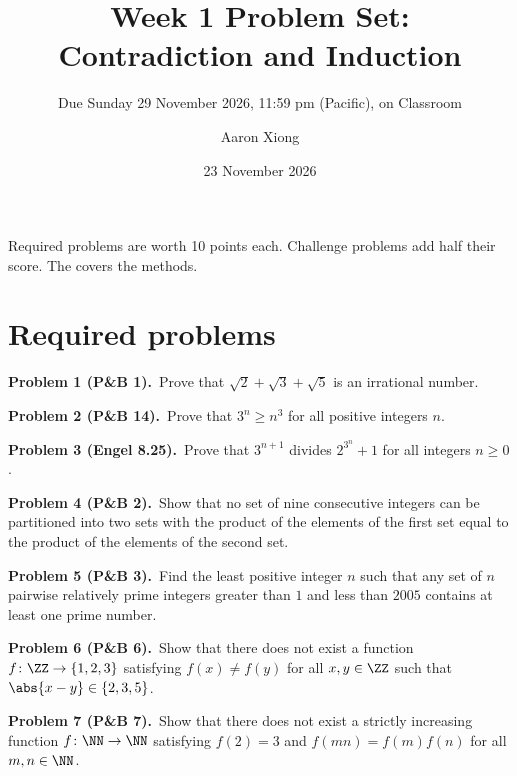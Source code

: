 \documentclass[10pt]{scrartcl}
\title{Week 1 Problem Set: Contradiction and Induction}
\subtitle{Due Sunday 29 November 2026, 11:59 pm (Pacific), on Classroom}
\author{Aaron Xiong}
\date{23 November 2026}
\begin{document}
\maketitle

Required problems are worth 10 points each. Challenge problems add half their score. The  covers the methods.

\section*{Required problems}

\begin{prob}\textbf{Problem 1 (P\&B 1).}\ Prove that $\sqrt2 + \sqrt3 + \sqrt5$ is an irrational number.\end{prob}

\begin{prob}\textbf{Problem 2 (P\&B 14).}\ Prove that $3^n \geq n^3$ for all positive integers $n$.\end{prob}

\begin{prob}\textbf{Problem 3 (Engel 8.25).}\ Prove that $3^{n+1}$ divides $2^{3^n} + 1$ for all integers $n \geq 0$.\end{prob}

\begin{prob}\textbf{Problem 4 (P\&B 2).}\ Show that no set of nine consecutive integers can be partitioned into two sets with the product of the elements of the first set equal to the product of the elements of the second set.\end{prob}

\begin{prob}\textbf{Problem 5 (P\&B 3).}\ Find the least positive integer $n$ such that any set of $n$ pairwise relatively prime integers greater than $1$ and less than $2005$ contains at least one prime number.\end{prob}

\begin{prob}\textbf{Problem 6 (P\&B 6).}\ Show that there does not exist a function $f \colon \ZZ \to \{1, 2, 3\}$ satisfying $f(x) \neq f(y)$ for all $x, y \in \ZZ$ such that $\abs{x - y} \in \{2, 3, 5\}$.\end{prob}

\begin{prob}\textbf{Problem 7 (P\&B 7).}\ Show that there does not exist a strictly increasing function $f \colon \NN \to \NN$ satisfying $f(2) = 3$ and $f(mn) = f(m) f(n)$ for all $m, n \in \NN$.\end{prob}
\end{document}
